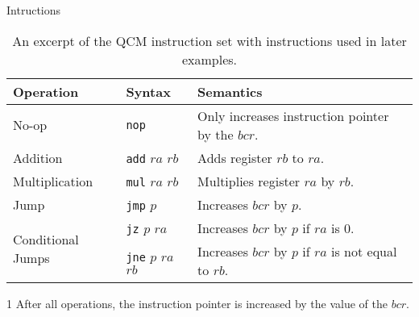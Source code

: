 \begin{frame}{Intructions}
    \begin{table}[htp]
        \centering
        \begin{threeparttable}[b]
            \begin{tabular}{llp{}}
                \multicolumn{1}{l|}{Operation}                          & \multicolumn{1}{l|}{Syntax}                                      & Semantics\tnote{1}                                                              \\ \hline
                
                \multicolumn{1}{l|}{No-op}                              & \multicolumn{1}{l|}{\texttt{nop}}               & Only increases instruction pointer by the $bcr$.     \\ \hline
                
                \multicolumn{1}{l|}{Addition}                           & \multicolumn{1}{l|}{\texttt{add} $ra$ $rb$}     & Adds register $rb$ to $ra$.                                            \\
                \multicolumn{1}{l|}{Multiplication}                     & \multicolumn{1}{l|}{\texttt{mul} $ra$ $rb$}     & Multiplies register $ra$ by $rb$.                                      \\ \hline
                
                \multicolumn{1}{l|}{Jump}                               & \multicolumn{1}{l|}{\texttt{jmp} $p$}           & Increases $bcr$ by $p$.                              \\
                \multicolumn{1}{l|}{\multirow{2}{*}{Conditional Jumps}} & \multicolumn{1}{l|}{\texttt{jz} $p$ $ra$}       & Increases $bcr$ by $p$ if $ra$ is $0$.               \\
                \multicolumn{1}{l|}{}                                   & \multicolumn{1}{l|}{\texttt{jne} $p$ $ra$ $rb$} & Increases $bcr$ by $p$ if $ra$ is not equal to $rb$. 
            \end{tabular}
            \begin{tablenotes}
                \item [1] After all operations, the instruction pointer is increased by the value of the $bcr$.
            \end{tablenotes}
        \end{threeparttable}
        \caption{An excerpt of the QCM instruction set with instructions used in later examples.}
        \label{tab:qcm_instructionset}
    \end{table}
\end{frame}
